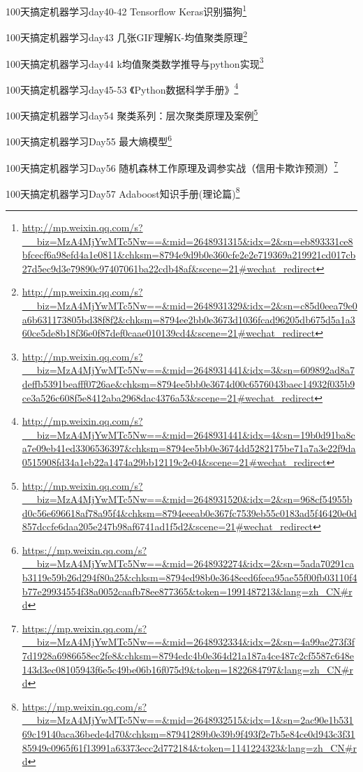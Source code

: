 \documentclass[]{ctexbook}
\renewcommand{\href}[2]{#2\footnote{\url{#1}}}
\begin{document}
\href{http://mp.weixin.qq.com/s?__biz=MzA4MjYwMTc5Nw==\&mid=2648931315\&idx=2\&sn=eb893331ce8bfcecf6a98efd4a1e0811\&chksm=8794e9d9b0e360cfe2e2e719369a219921cd017cb27d5ec9d3e79890c97407061ba22cdb48af\&scene=21\#wechat_redirect}{100天搞定机器学习\textbar{}day40-42 Tensorflow Keras识别猫狗}

\href{http://mp.weixin.qq.com/s?__biz=MzA4MjYwMTc5Nw==\&mid=2648931329\&idx=2\&sn=c85d0eea79e0a6b631173805bd38f8f2\&chksm=8794ee2bb0e3673d1036fcad96205db675d5a1a360ce5de8b18f36e0f87def0caae010139cd4\&scene=21\#wechat_redirect}{100天搞定机器学习\textbar{}day43 几张GIF理解K-均值聚类原理}

\href{http://mp.weixin.qq.com/s?__biz=MzA4MjYwMTc5Nw==\&mid=2648931441\&idx=3\&sn=609892ad8a7deffb5391beafff0726ae\&chksm=8794ee5bb0e3674d00c6576043baec14932f035b9ce3a526c608f5e8412aba2968dac4376a53\&scene=21\#wechat_redirect}{100天搞定机器学习\textbar{}day44 k均值聚类数学推导与python实现}

\href{http://mp.weixin.qq.com/s?__biz=MzA4MjYwMTc5Nw==\&mid=2648931441\&idx=4\&sn=19b0d91ba8ca7e09eb41ed3306536397\&chksm=8794ee5bb0e3674dd5282175be71a7a3e22f9da0515908fd34a1eb22a1474a29bb12119c2e04\&scene=21\#wechat_redirect}{100天搞定机器学习\textbar{}day45-53 《Python数据科学手册》}

\href{http://mp.weixin.qq.com/s?__biz=MzA4MjYwMTc5Nw==\&mid=2648931520\&idx=2\&sn=968cf54955bd0c56e696618af78a95f4\&chksm=8794eeeab0e367fc7539eb55c0183ad5f46420e0d857dccfe6daa205e247b98af6741ad1f5d2\&scene=21\#wechat_redirect}{100天搞定机器学习\textbar{}day54 聚类系列：层次聚类原理及案例}

\href{https://mp.weixin.qq.com/s?__biz=MzA4MjYwMTc5Nw==\&mid=2648932274\&idx=2\&sn=5ada70291cab3119e59b26d294f80a25\&chksm=8794ed98b0e3648eed6feea95ae55f00fb03110f4b77e29934554f38a0052caafb78ee877365\&token=1991487213\&lang=zh_CN\#rd}{100天搞定机器学习\textbar{}Day55 最大熵模型}

\href{https://mp.weixin.qq.com/s?__biz=MzA4MjYwMTc5Nw==\&mid=2648932334\&idx=2\&sn=4a99ae273f3f7d1928a6986658ec2fe8\&chksm=8794edc4b0e364d21a187a4ce487c2cf5587c648e143d3ec08105943f6e5c49be06b16f075d9\&token=1822684797\&lang=zh_CN\#rd}{100天搞定机器学习\textbar{}Day56 随机森林工作原理及调参实战（信用卡欺诈预测）}

\href{https://mp.weixin.qq.com/s?__biz=MzA4MjYwMTc5Nw==\&mid=2648932515\&idx=1\&sn=2ac90e1b53169c19140aca36bede4d70\&chksm=87941289b0e39b9f493f2e7b5e84ce0d943c3f3185949c0965f61f13991a63373ecc2d772184\&token=1141224323\&lang=zh_CN\#rd}{100天搞定机器学习\textbar{}Day57 Adaboost知识手册(理论篇)}
\end{document}
